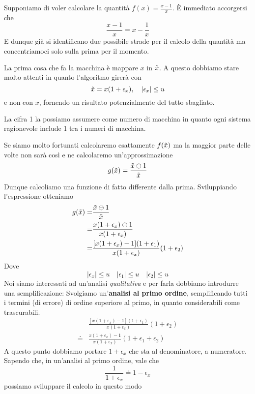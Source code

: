 \begin{example}
	Supponiamo di voler calcolare la quantità $f(x) = \frac{x - 1}{x}$. \`E immediato accorgersi che
	\[ \frac{x - 1}{x} = x - \frac{1}{x} \]
	E dunque già si identificano due possibile strade per il calcolo della quantità ma concentriamoci solo
	sulla prima per il momento.

	La prima cosa che fa la macchina è mappare $x$ in $\tilde{x}$. A questo dobbiamo stare molto attenti in
	quanto l'algoritmo girerà con
	\[ \tilde{x} = x (1 + \epsilon_x), \quad |\epsilon_x| \leq u \]
	e non con $x$, fornendo un risultato potenzialmente del tutto sbagliato.

	La cifra 1 la possiamo assumere come numero di macchina in quanto ogni sistema ragionevole include 1 tra
	i numeri di macchina.

	Se siamo molto fortunati calcolaremo esattamente $f(\tilde{x})$ ma la maggior parte delle volte non sarà
	così e ne calcolaremo un'approssimazione
	\[ g(\tilde{x}) = \frac{\tilde{x} \ominus 1}{\tilde{x}} \]
	Dunque calcoliamo una funzione di fatto differente dalla prima. Sviluppiando l'espressione otteniamo
	\begin{align*}
		g(\tilde{x})  = & \frac{\tilde{x} \ominus 1}{\tilde{x}}                                                            \\
		=         & \frac{x (1 + \epsilon_x) \ominus 1}{x (1 + \epsilon_x)}                              \\
		=         & \frac{[x (1 + \epsilon_x) - 1](1 + \epsilon_1)}{x (1 + \epsilon_x)} (1 + \epsilon_2)
	\end{align*}
	Dove
	\[ |\epsilon_x| \leq u \quad |\epsilon_1| \leq u \quad |\epsilon_2| \leq u \]
	Noi siamo interessati ad un'analisi \emph{qualitativa} e per farla dobbiamo introdurre una semplificazione:
	Svolgiamo un'\textbf{analisi al primo ordine}, semplificando tutti i termini (di errore) di ordine superiore
	al primo, in quanto considerabili come trascurabili.
	\begin{align*}
		       & \frac{[x (1 + \epsilon_x) - 1](1 + \epsilon_1)}{x (1 + \epsilon_x)} (1 + \epsilon_2) \\
		\doteq & \frac{x (1 + \epsilon_x) - 1}{x (1 + \epsilon_x)} (1 + \epsilon_1 + \epsilon_2)
	\end{align*}
	A questo punto dobbiamo portare $1 + \epsilon_x$ che sta al denominatore, a numeratore. Sapendo che, in
	un'analisi al primo ordine, vale che
	\[ \frac{1}{1 + \epsilon_x} \doteq 1 - \epsilon_x \]
	possiamo sviluppare il calcolo in questo modo
	\begin{align*}

\end{align*}
\end{example}
